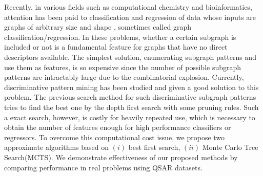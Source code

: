 Recently, in various fields such as computational chemistry and bioinformatics,
attention has been paid to classification and regression
of data whose inputs are graphs of arbitrary size and shape
, sometimes called graph classification/regression.
In these problems,
whether a certain subgraph is included or not 
is a fundamental feature for graphs that have no direct descriptors available.
The simplest solution, 
enumerating subgraph patterns and use them as features, is so expensive 
since the number of possible subgraph patterns are intractably large 
due to the combinatorial explosion.
Currently, discriminative pattern mining has been studied and given a good solution to this problem.
The previous search method for such discriminative subgraph patterns 
tries to find the best one by the depth first search with some pruning rules.
Such a exact search, however, is costly for heavily repeated use, 
which is necessary to obtain the number of features enough for high performance classifiers or regressors.
To overcome this computational cost issue, 
we propose two approximate algorithms based on 
$(i)$ best first search, $(ii)$ Monte Carlo Tree Search(MCTS). 
We demonstrate effectiveness of our proposed methods by comparing performance 
in real problems using QSAR datasets.
